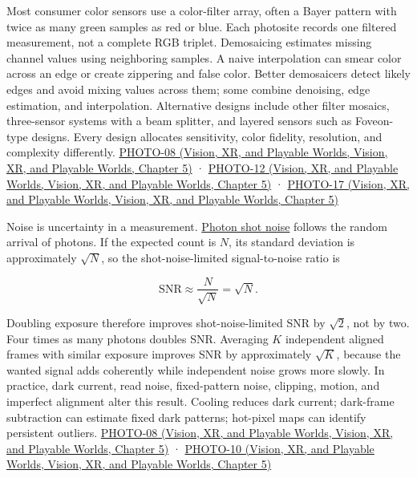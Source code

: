Most consumer color sensors use a color-filter array, often a Bayer pattern with twice as many green samples as red or blue. Each photosite records one filtered measurement, not a complete RGB triplet. Demosaicing estimates missing channel values using neighboring samples. A naive interpolation can smear color across an edge or create zippering and false color. Better demosaicers detect likely edges and avoid mixing values across them; some combine denoising, edge estimation, and interpolation. Alternative designs include other filter mosaics, three-sensor systems with a beam splitter, and layered sensors such as Foveon-type designs. Every design allocates sensitivity, color fidelity, resolution, and complexity differently. \href{../07-Vision-XR-and-Playable-Worlds/main.pdf\#nameddest=04-visual-computing-ii-ch036-photo-08---photography-session-08}{PHOTO-08 (Vision, XR, and Playable Worlds, Vision, XR, and Playable Worlds, Chapter 5)} · \href{../07-Vision-XR-and-Playable-Worlds/main.pdf\#nameddest=04-visual-computing-ii-ch036-photo-12---photography-session-12}{PHOTO-12 (Vision, XR, and Playable Worlds, Vision, XR, and Playable Worlds, Chapter 5)} · \href{../07-Vision-XR-and-Playable-Worlds/main.pdf\#nameddest=04-visual-computing-ii-ch036-photo-17---photography-session-17}{PHOTO-17 (Vision, XR, and Playable Worlds, Vision, XR, and Playable Worlds, Chapter 5)}

Noise is uncertainty in a measurement. \hyperref[appendix-92d45cdf2afc]{Photon shot noise} follows the random arrival of photons. If the expected count is \(N\), its standard deviation is approximately \(\sqrt{N}\), so the shot-noise-limited signal-to-noise ratio is

\[
\mathrm{SNR}\approx\frac{N}{\sqrt{N}}=\sqrt{N}.
\]

Doubling exposure therefore improves shot-noise-limited SNR by \(\sqrt 2\), not by two. Four times as many photons doubles SNR. Averaging \(K\) independent aligned frames with similar exposure improves SNR by approximately \(\sqrt K\), because the wanted signal adds coherently while independent noise grows more slowly. In practice, dark current, read noise, fixed-pattern noise, clipping, motion, and imperfect alignment alter this result. Cooling reduces dark current; dark-frame subtraction can estimate fixed dark patterns; hot-pixel maps can identify persistent outliers. \href{../07-Vision-XR-and-Playable-Worlds/main.pdf\#nameddest=04-visual-computing-ii-ch036-photo-08---photography-session-08}{PHOTO-08 (Vision, XR, and Playable Worlds, Vision, XR, and Playable Worlds, Chapter 5)} · \href{../07-Vision-XR-and-Playable-Worlds/main.pdf\#nameddest=04-visual-computing-ii-ch036-photo-10---photography-session-10}{PHOTO-10 (Vision, XR, and Playable Worlds, Vision, XR, and Playable Worlds, Chapter 5)}

